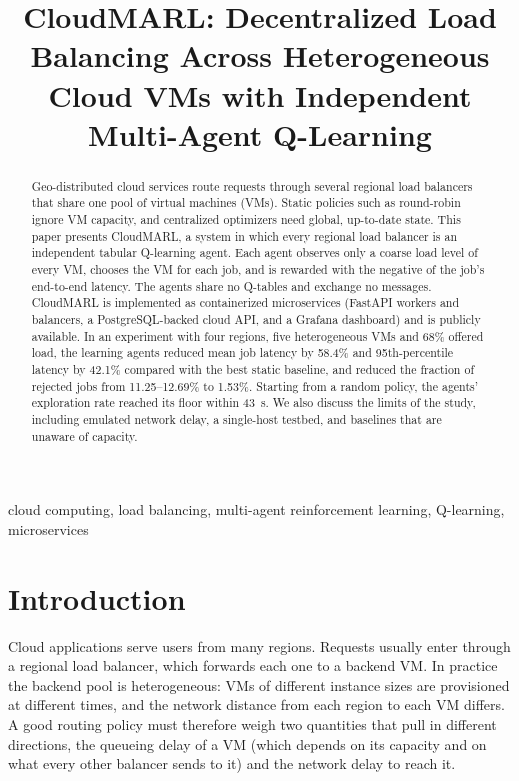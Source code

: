 \documentclass[conference]{IEEEtran}
\begin{document}
\title{CloudMARL: Decentralized Load Balancing Across Heterogeneous Cloud VMs with Independent Multi-Agent Q-Learning}

\author{
}

\maketitle

\begin{abstract}
Geo-distributed cloud services route requests through several regional load balancers that share one pool of virtual machines (VMs). Static policies such as round-robin ignore VM capacity, and centralized optimizers need global, up-to-date state. This paper presents CloudMARL, a system in which every regional load balancer is an independent tabular Q-learning agent. Each agent observes only a coarse load level of every VM, chooses the VM for each job, and is rewarded with the negative of the job's end-to-end latency. The agents share no Q-tables and exchange no messages. CloudMARL is implemented as containerized microservices (FastAPI workers and balancers, a PostgreSQL-backed cloud API, and a Grafana dashboard) and is publicly available. In an experiment with four regions, five heterogeneous VMs and 68\% offered load, the learning agents reduced mean job latency by 58.4\% and 95th-percentile latency by 42.1\% compared with the best static baseline, and reduced the fraction of rejected jobs from 11.25--12.69\% to 1.53\%. Starting from a random policy, the agents' exploration rate reached its floor within 43~s. We also discuss the limits of the study, including emulated network delay, a single-host testbed, and baselines that are unaware of capacity.
\end{abstract}

\begin{IEEEkeywords}
cloud computing, load balancing, multi-agent reinforcement learning, Q-learning, microservices
\end{IEEEkeywords}

\section{Introduction}
Cloud applications serve users from many regions. Requests usually enter through a regional load balancer, which forwards each one to a backend VM. In practice the backend pool is heterogeneous: VMs of different instance sizes are provisioned at different times, and the network distance from each region to each VM differs. A good routing policy must therefore weigh two quantities that pull in different directions, the queueing delay of a VM (which depends on its capacity and on what every other balancer sends to it) and the network delay to reach it.
\end{document}

